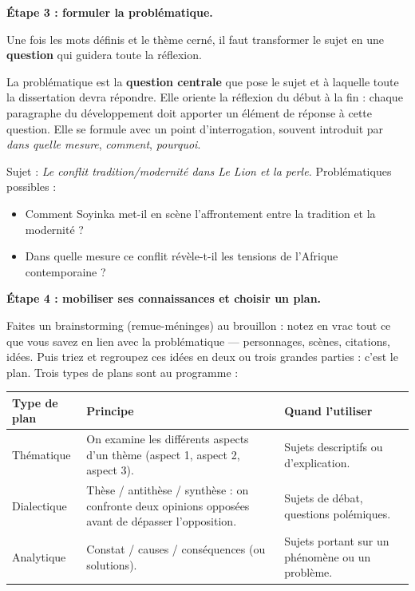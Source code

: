 \documentclass[11pt]{article}
\newcommand{\cle}[1]{{\popxbold\color{popdark}#1}}
\begin{document}
\textbf{Étape 3 : formuler la problématique.}\par
Une fois les mots définis et le thème cerné, il faut transformer le sujet en une \textbf{question} qui guidera toute la réflexion.

\begin{definition}[La problématique]
La \cle{problématique} est la \textbf{question centrale} que pose le sujet et à laquelle toute la dissertation devra répondre. Elle oriente la réflexion du début à la fin : chaque paragraphe du développement doit apporter un élément de réponse à cette question. Elle se formule avec un point d'interrogation, souvent introduit par \emph{dans quelle mesure}, \emph{comment}, \emph{pourquoi}.
\end{definition}

\begin{exemplebox}
Sujet : \emph{Le conflit tradition/modernité dans Le Lion et la perle.}
Problématiques possibles :
\begin{itemize}
\item Comment Soyinka met-il en scène l'affrontement entre la tradition et la modernité ?
\item Dans quelle mesure ce conflit révèle-t-il les tensions de l'Afrique contemporaine ?
\end{itemize}
\end{exemplebox}

\textbf{Étape 4 : mobiliser ses connaissances et choisir un plan.}\par
Faites un \cle{brainstorming} (remue-méninges) au brouillon : notez en vrac tout ce que vous savez en lien avec la problématique — personnages, scènes, citations, idées. Puis triez et regroupez ces idées en deux ou trois grandes parties : c'est le \cle{plan}. Trois types de plans sont au programme :

\begin{center}
\begin{tabularx}{\linewidth}{|l|X|X|}
\hline
\rowcolor{popblueL} \textbf{Type de plan} & \textbf{Principe} & \textbf{Quand l'utiliser} \\
\hline
Thématique & On examine les différents aspects d'un thème (aspect 1, aspect 2, aspect 3). & Sujets descriptifs ou d'explication. \\
\hline
Dialectique & Thèse / antithèse / synthèse : on confronte deux opinions opposées avant de dépasser l'opposition. & Sujets de débat, questions polémiques. \\
\hline
Analytique & Constat / causes / conséquences (ou solutions). & Sujets portant sur un phénomène ou un problème. \\
\hline
\end{tabularx}
\end{center}
\end{document}
